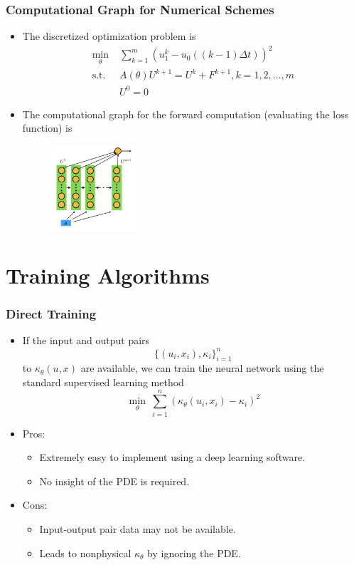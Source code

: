 \documentclass{beamer}
\begin{document}
\begin{frame}
	\frametitle{Computational Graph for Numerical Schemes}
	
	\begin{itemize}
		\item The discretized optimization problem is 
		\begin{align*}
			\min_{\theta}& \; \sum_{k=1}^m (u^k_1 - u_0( (k-1)\Delta t))^2\\
			\text{s.t.} & \; A(\theta)U^{k+1} = U^k + F^{k+1}, k = 1, 2,\ldots, m \\
			& \; U^0 = 0
		\end{align*}
		\item The computational graph for the forward computation (evaluating the loss function) is 
		\begin{figure}[hbt]
		\centering
  \includegraphics[width=0.3\textwidth]{figures/heatcg2}
\end{figure}

	\end{itemize}
\end{frame}



\section{Training Algorithms}

\begin{frame}
	\frametitle{Direct Training}
	
	\begin{itemize}
		\item If the input and output pairs
		$$\{(u_i, x_i), \kappa_i\}_{i=1}^n$$
		to $\kappa_\theta(u,x)$ are available, we can train the neural network using the standard supervised learning method
	$$\min_\theta\ \sum_{i=1}^n (\kappa_\theta(u_i, x_i) - \kappa_i)^2$$
	\item Pros:
	\begin{itemize}
	\item Extremely easy to implement using a deep learning software. 
	\item No insight of the PDE is required.
	\end{itemize}
	\item Cons:
	\begin{itemize}
	\item Input-output pair data may not be available.
	\item Leads to nonphysical $\kappa_\theta$ by ignoring the PDE. 
	\end{itemize}
	\end{itemize}
\end{frame}
\end{document}
